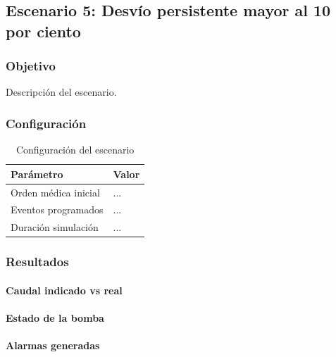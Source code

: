 \subsection{Escenario 5: Desvío persistente mayor al 10 por ciento }

\subsubsection{Objetivo}

Descripción del escenario.

\subsubsection{Configuración}

\begin{table}[H]
\centering
\begin{tabular}{ll}
\toprule
Parámetro & Valor \\
\midrule
Orden médica inicial & ... \\
Eventos programados & ... \\
Duración simulación & ... \\
\bottomrule
\end{tabular}
\caption{Configuración del escenario}
\end{table}

\subsubsection{Resultados}

\paragraph{Caudal indicado vs real}


\paragraph{Estado de la bomba}


\paragraph{Alarmas generadas}

